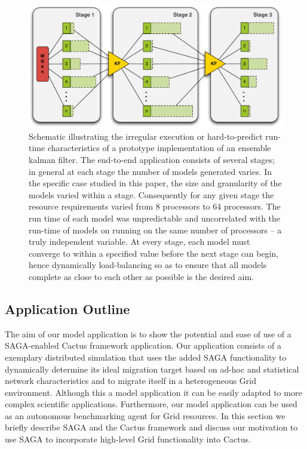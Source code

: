 \documentclass[conference,final]{IEEEtran}
\begin{document}
\begin{figure}
\begin{center}
\includegraphics*[scale=0.36,]{./figures/3StageKalmanFilter}
\end{center}
\caption{Schematic illustrating the irregular execution or
  hard-to-predict run-time characteristics of a prototype
  implementation of an ensemble kalman filter. The end-to-end
  application consists of several stages; in general at each stage the
  number of models generated varies. In the specific case studied in
  this paper, the size and granularity of the models varied within a
  stage. Consequently for any given stage the resource requirements
  varied from 8 processors to 64 processors.  The run time of each
  model was unpredictable and uncorrelated with the run-time of models
  on running on the same number of processors -- a truly independent
  variable. At every stage, each model must converge to within a
  specified value before the next stage can begin, hence dynamically
  load-balancing so as to ensure that all models complete as close to
  each other as possible is the desired aim.}
\label{fig:irregular_execution}
\end{figure}

\subsection{Application Outline}

The aim of our model application is to show the potential and ease of
use of a SAGA-enabled Cactus framework application. Our application
consists of a exemplary distributed simulation that uses the added
SAGA functionality to dynamically determine its ideal migration target
based on ad-hoc and statistical network characteristics and to migrate
itself in a heterogeneous Grid environment.  Although this a model
application it can be easily adapted to more complex scientific
applications.  Furthermore, our model application can be used as an
autonomous benchmarking agent for Grid resources. In this section we
briefly describe SAGA and the Cactus framework and discuss our
motivation to use SAGA to incorporate high-level Grid functionality
into Cactus.
\end{document}
